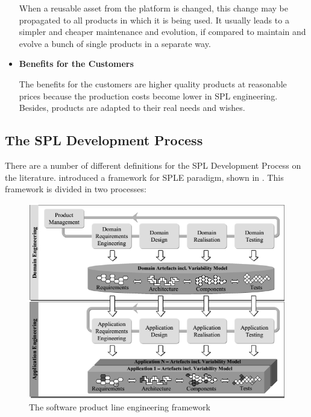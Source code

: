 \begin{itemize}
When a reusable asset from the platform is changed, this change may be
propagated to all products in which it is being used. It usually leads to a simpler and cheaper maintenance and 
evolution, if compared to maintain and evolve a bunch of single products in a separate way.

\item \textbf{Benefits for the Customers}

The benefits for the customers are higher quality products at reasonable prices
because the production costs become lower in \ac{SPL} engineering. Besides, products are adapted to their 
real needs and wishes.
\end{itemize}


\subsection{The SPL Development Process}
There are a number of different definitions for the \acf{SPL} Development
Process on the literature. \citep{Pohl2005} introduced a framework for SPLE paradigm, shown in
. This framework is divided in two processes: 

\begin{figure}[htp]
\begin{center}
  \includegraphics[width=13cm]{chapters/background/img/pohl-framework.png}
  \caption[The software product line engineering framework]{The software product line engineering framework \citep{Pohl2005}}
  \label{fg:spl-pohlframework}
\end{center}
\end{figure}

